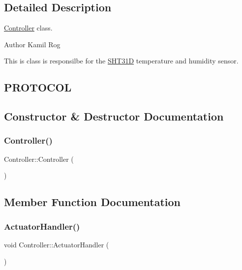 \subsection{Detailed Description}
\hyperlink{classController}{Controller} class. 

\begin{DoxyAuthor}{Author}
Kamil Rog
\end{DoxyAuthor}
This is class is responsilbe for the \hyperlink{classSHT31D}{S\+H\+T31D} temperature and humidity sensor.\hypertarget{Controller.h_PROTOCOL}{}\subsection{P\+R\+O\+T\+O\+C\+OL}\label{Controller.h_PROTOCOL}


\subsection{Constructor \& Destructor Documentation}
\mbox{\label{classController_a95c56822d667e94b031451729ce069a9}} 
\subsubsection{\texorpdfstring{Controller()}{Controller()}}
{\footnotesize\ttfamily Controller\+::\+Controller (\begin{DoxyParamCaption}{ }\end{DoxyParamCaption})\hspace{0.3cm}{\ttfamily [inline]}}



\subsection{Member Function Documentation}
\mbox{\label{classController_acd0145853d19eaf3ef9d15f6203ace69}} 
\subsubsection{\texorpdfstring{Actuator\+Handler()}{ActuatorHandler()}}
{\footnotesize\ttfamily void Controller\+::\+Actuator\+Handler (\begin{DoxyParamCaption}{ }\end{DoxyParamCaption})\hspace{0.3cm}{\ttfamily [private]}}


